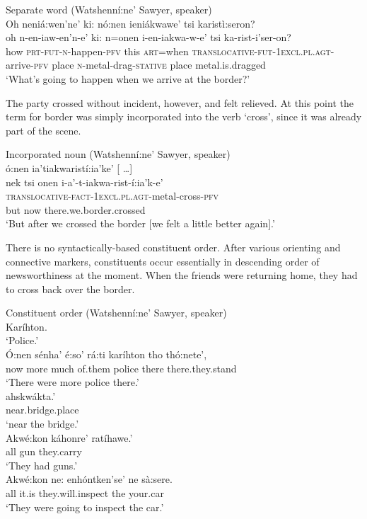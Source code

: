 \documentclass[output=paper,colorlinks,citecolor=brown]{langscibook}
\begin{document}
\ea Separate word (Watshenní:ne' Sawyer, speaker)\\
\glll  Oh   neniá:wen’ne’    ki: nó:nen  ieniákwawe’     tsi karistì:seron?\\
       oh   n-en-iaw-en’n-e’ ki: n=onen  i-en-iakwa-w-e’ tsi ka-rist-i’ser-on?\\
      how  \textsc{prt-fut-n}-happen-\textsc{pfv} this \textsc{art}=when \textsc{translocative-fut-1excl.pl.agt}-arrive-\textsc{pfv} place  \textsc{n}-metal-drag-\textsc{stative} place {metal.is.dragged}\\
\glt `What's going to happen when we arrive at the border?’
\z

The party crossed without incident, however, and felt relieved. At this point the term for border was simply incorporated into the verb `cross', since it was already part of the scene.

\ea Incorporated noun (Watshenní:ne' Sawyer, speaker)\\
  ó:nen                            {ia'tiakwaristí:ia'ke'  {[} \ldots {]}}\\
       {nek tsi}  onen                             i-a'-t-iakwa-rist-í:ia'k-e'\\
       {}         {}                               \textsc{translocative-fact-1excl.pl.agt}-metal-cross-\textsc{pfv}\\
       but        now                              {there.we.border.crossed}\\
\glt  `But after we crossed the border {[}we felt a little better again{]}.'
\z

There is no syntactically-based constituent order. After various orienting and connective markers, constituents occur essentially in descending order of newsworthiness at the moment. When the friends were returning home, they had to cross back over the border.

\ea Constituent order (Watshenní:ne' Sawyer, speaker)\\
Karíhton.\\
\glt `Police.'\medskip\\
\gll Ó:nen sénha' é:so' rá:ti karíhton tho thó:nete',\\
     now more much {of.them} police there {there.they.stand}\\
\glt `There were more police there.'\medskip\\
     ahskwákta.'\\
     {near.bridge.place}\\
\glt `near the bridge.'\medskip\\
\gll Akwé:kon káhonre' ratíhawe.'\\
     all gun {they.carry}\\
\glt `They had guns.'\medskip\\
\gll Akwé:kon ne: enhóntken'se' ne sà:sere.\\
     all {it.is} {they.will.inspect} the {your.car}\\
\glt `They were going to inspect the car.'
\z
\end{document}
